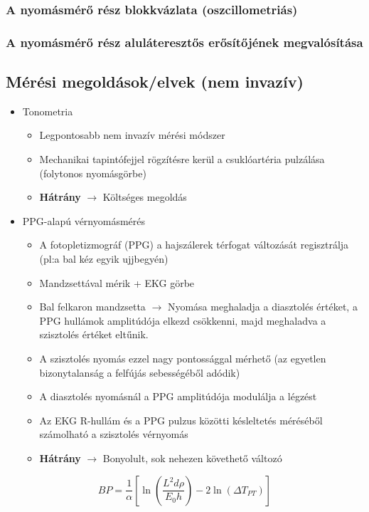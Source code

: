 \subsubsection{A nyomásmérő rész blokkvázlata (oszcillometriás)}
\begin{center}
\end{center}

\subsubsection{A nyomásmérő rész aluláteresztős erősítőjének megvalósítása}
\begin{center}
\end{center}

\subsection{Mérési megoldások/elvek (nem invazív)}
\begin{itemize}
    \item Tonometria
    \begin{itemize}
        \item Legpontosabb nem invazív mérési módszer
        \item Mechanikai tapintófejjel rögzítésre kerül a csuklóartéria pulzálása (folytonos nyomásgörbe)
        \item \textbf{Hátrány} $\rightarrow$ Költséges megoldás
    \end{itemize}
    \item PPG-alapú vérnyomásmérés
    \begin{itemize}
        \item A fotopletizmográf (PPG) a hajszálerek térfogat változását regisztrálja (pl:a bal kéz egyik ujjbegyén)
        \item Mandzsettával mérik + EKG görbe
        \item Bal felkaron mandzsetta $\rightarrow$ Nyomása meghaladja a diasztolés értéket, a PPG hullámok amplitúdója elkezd csökkenni, majd meghaladva a szisztolés értéket eltűnik.
        \item A szisztolés nyomás ezzel nagy pontossággal mérhető (az egyetlen bizonytalanság a felfújás sebességéből adódik)
        \item A diasztolés nyomásnál a PPG amplitúdója modulálja a légzést
        \item Az EKG R-hullám és a PPG pulzus közötti késleltetés méréséből számolható a szisztolés vérnyomás
        \item \textbf{Hátrány} $\rightarrow$ Bonyolult, sok nehezen követhető változó
    \end{itemize}
\end{itemize}
\[ BP = \frac{1}{\alpha} \left[ \ln \left( \frac{L^2 d\rho}{E_0 h} \right) - 2 \ln(\Delta T_{PT}) \right] \]

